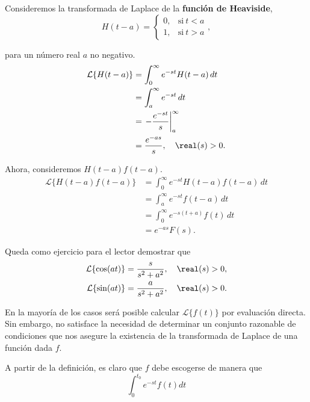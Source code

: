 \begin{ejemplo}
    Consideremos la transformada de Laplace de la \textbf{función de Heaviside},
    $$H(t-a) = \left\{ \begin{array}{cl}
     0,& \text{si} ~ t < a  \\
     1,& \text{si} ~ t > a
    \end{array} \right.,$$

    para un número real $a$ no negativo.
    \begin{align*}
        \mathcal{L}\{H(t-a)\} &= \int_0^{\infty} e^{-st} H(t-a) \,dt \\
        &= \int_a^{\infty} e^{-st} \,dt \\
        &= \left. - \frac{e^{-st}}{s}\right|_a^{\infty} \\
        &= \frac{e^{-as}}{s}, \quad \real(s) > 0.
    \end{align*}

    Ahora, consideremos $H(t-a)f(t-a)$.
    \begin{align*}
        \mathcal{L}\{H(t-a)f(t-a)\} &= \int_0^{\infty} e^{-st} H(t-a)f(t-a) \,dt \\
        &= \int_a^{\infty} e^{-st} f(t-a) \,dt \\
        &= \int_0^{\infty} e^{-s(t+a)} f(t) \,dt \\
        &= e^{-as} F(s).
    \end{align*}

\end{ejemplo}

\begin{ejemplo}
    Queda como ejercicio para el lector demostrar que
    \begin{align*}
        \mathcal{L}\{\cos(at)\} &= \frac{s}{s^2+a^2}, \quad \real(s) > 0, \\
        \mathcal{L}\{\sin(at)\} &= \frac{a}{s^2+a^2}, \quad \real(s) > 0.
    \end{align*}
\end{ejemplo}

En la mayoría de los casos será posible calcular $\mathcal{L}\{f(t)\}$ por evaluación directa. Sin embargo, no satisface la necesidad de determinar un conjunto razonable de condiciones que nos asegure la existencia de la transformada de Laplace de una función dada $f$.

A partir de la definición, es claro que $f$ debe escogerse de manera que
\begin{equation}
\int_0^{t_0} e^{-st} f(t) dt \label{Laplace1}
\end{equation}

